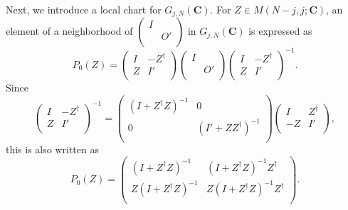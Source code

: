 \documentclass[makeidx,12pt,openany]{report}
\begin{document}
Next, we introduce a local chart for $G_{j,N}({\mathbf{C}})$. For $Z \in M(N-j,j;{\mathbf{C}})$, an element of a neighborhood of 
         $\left(
           \begin{array}{cc}
               I &    \\
                 & O' \\
            \end{array}
           \right) $
in $G_{j,N}({\mathbf{C}})$ is expressed as 
\begin{equation}
 P_0(Z)=
          \left(
           \begin{array}{cc}
               I & -Z^{\dag}  \\
               Z & I' \\
            \end{array}
           \right)  
          \left(
           \begin{array}{cc}
               I &    \\
                 & O' \\
            \end{array}
           \right)  
          \left(
           \begin{array}{cc}
               I & -Z^{\dag} \\
               Z & I' \\
            \end{array}
           \right)^{-1} .
\end{equation}
Since 
\begin{equation}
          \left(
           \begin{array}{cc}
               I & -Z^{\dag} \\
               Z & I' \\
            \end{array}
           \right)^{-1}
=\left(
   \begin{array}{cc}
     (I+Z^{\dag}Z)^{-1} & 0 \\
     0 & (I'+Z Z^{\dag})^{-1} \\
   \end{array}
 \right) 
          \left(
           \begin{array}{cc}
               I & Z^{\dag} \\
              -Z & I' \\
            \end{array}
           \right) ,
\end{equation}
this is also written as 
\begin{equation}
 P_0(Z)=
 \left(
   \begin{array}{cc}
     (I+Z^{\dag}Z)^{-1} & (I+Z^{\dag}Z)^{-1} Z^{\dag} \\
     Z(I+Z^{\dag}Z)^{-1} & Z(I+Z^{\dag}Z)^{-1} Z^{\dag} \\
   \end{array}
 \right) .
\end{equation}
\end{document}

